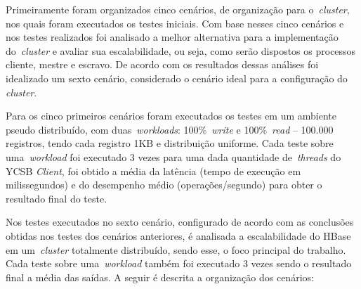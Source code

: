 \documentclass[12pt]{article}
\begin{document}

Primeiramente foram organizados cinco cenários, de organização para o~\emph{cluster}, nos quais foram executados os testes iniciais. Com base nesses cinco cenários e nos testes realizados foi analisado a melhor alternativa para a implementação do~\emph{cluster} e avaliar sua escalabilidade, ou seja, como serão dispostos os processos cliente, mestre e escravo. De acordo com os resultados dessas análises foi idealizado um sexto cenário, considerado o cenário ideal para a configuração do \emph{cluster}.

Para os cinco primeiros cenários foram executados os testes em um ambiente pseudo distribuído, com duas~\emph{workloads}: 100\%~\emph{write} e 100\%~\emph{read} -- 100.000 registros, tendo cada registro 1KB e distribuição uniforme. Cada teste sobre uma~\emph{workload} foi executado 3 vezes para uma dada quantidade de~\emph{threads} do YCSB \textit{Client}, foi obtido a média da latência (tempo de execução em milissegundos) e do desempenho médio (operações/segundo) para obter o resultado final do teste.

Nos testes executados no sexto cenário, configurado de acordo com as conclusões obtidas nos testes dos cenários anteriores, é analisada a escalabilidade do HBase em um~\emph{cluster} totalmente distribuído, sendo esse, o foco principal do trabalho. Cada teste sobre uma~\emph{workload} também foi executado 3 vezes sendo o resultado final a média das saídas. A seguir é descrita a organização dos cenários:

\end{document}
